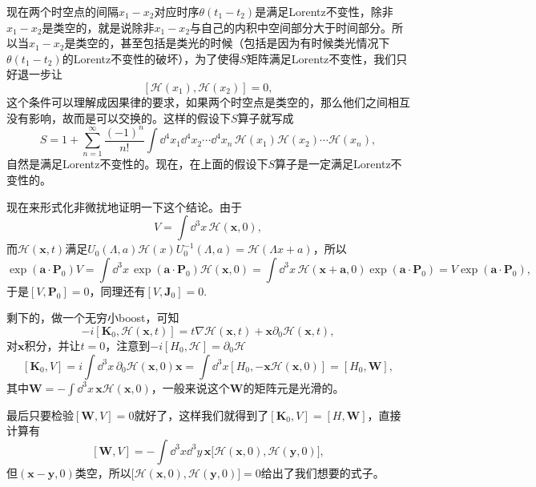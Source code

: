 现在两个时空点的间隔$x_1-x_2$对应时序$\theta(t_1-t_2)$是满足Lorentz不变性，除非$x_1-x_2$是类空的，就是说除非$x_1-x_2$与自己的内积中空间部分大于时间部分。所以当$x_1-x_2$是类空的，甚至包括是类光的时候（包括是因为有时候类光情况下$\theta(t_1-t_2)$的Lorentz不变性的破坏），为了使得$S$矩阵满足Lorentz不变性，我们只好退一步让
\[
	[\mathscr{H}(x_1),\mathscr{H}(x_2)]=0,
\]
这个条件可以理解成因果律的要求，如果两个时空点是类空的，那么他们之间相互没有影响，故而是可以交换的。这样的假设下$S$算子就写成
\[
S=1+\sum_{n=1}^{\infty}\frac{(-1)^n}{n!}\int\dd^4 x_1\dd^4 x_2\cdots\dd
^4 x_n\, \mathscr{H}(x_1)\mathscr{H}(x_2)\cdots \mathscr{H}(x_n),
\]
自然是满足Lorentz不变性的。现在，在上面的假设下$S$算子是一定满足Lorentz不变性的。


现在来形式化非微扰地证明一下这个结论。由于
\[
	V=\int \dd^3 x\,\mathscr{H}(\bm{x},0),
\]
而$\mathscr{H}(\bm{x},t)$满足$U_0(\Lambda,a)\mathscr{H}(x)U_0^{-1}(\Lambda,a)=\mathscr{H}(\Lambda x+a)$，所以
\[
	\exp(\bm{a}\cdot\bm{P}_0)V=\int \dd^3 x\,\exp(\bm{a}\cdot\bm{P}_0)\mathscr{H}(\bm{x},0)=\int \dd^3 x\,\mathscr{H}(\bm{x}+\bm{a},0)\exp(\bm{a}\cdot\bm{P}_0)=V \exp(\bm{a}\cdot\bm{P}_0),
\]
于是$[V,\bm{P}_0]=0$，同理还有$[V,\bm{J}_0]=0$.

剩下的，做一个无穷小boost，可知
\[
	-i[\bm{K}_0,\mathscr{H}(\bm{x},t)]=t\nabla\mathscr{H}(\bm{x},t)+\bm{x}\partial_0\mathscr{H}(\bm{x},t),
\]
对$\bm{x}$积分，并让$t=0$，注意到$-i[H_0,\mathscr{H}]=\partial_0\mathscr{H}$
\[
	[\bm{K}_0,V]=i\int \dd^3 x\,\partial_0\mathscr{H}(\bm{x},0) \bm{x}=\int \dd^3 x[H_0,-\bm{x}\mathscr{H}(\bm{x},0)]=[H_0,\bm{W}],
\]
其中$\bm{W}=-\int \dd^3 x\,\bm{x}\mathscr{H}(\bm{x},0)$，一般来说这个$\bm{W}$的矩阵元是光滑的。

最后只要检验$[\bm{W},V]=0$就好了，这样我们就得到了$[\bm{K}_0,V]=[H,\bm{W}]$，直接计算有
\[
	[\bm{W},V]=-\int \dd^3 x\dd^3y\, \bm{x}\bigl[\mathscr{H}(\bm{x},0),\mathscr{H}(\bm{y},0)\bigr],
\]
但$(\bm{x}-\bm{y},0)$类空，所以$\bigl[\mathscr{H}(\bm{x},0),\mathscr{H}(\bm{y},0)\bigr]=0$给出了我们想要的式子。

